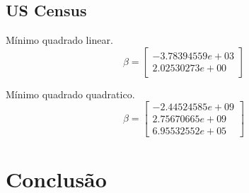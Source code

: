 \documentclass[a4paper, 11pt]{article}
\begin{document}
\subsection*{US Census}
Mínimo quadrado linear.
$$ \beta =
\begin{bmatrix}
-3.78394559e+03 \\
2.02530273e+00
\end{bmatrix}
$$

Mínimo quadrado quadratico.
$$ \beta =
\begin{bmatrix}
-2.44524585e+09 \\
2.75670665e+09\\
6.95532552e+05
\end{bmatrix}
$$




\section*{Conclusão}
\lipsum[5]

\end{document}
